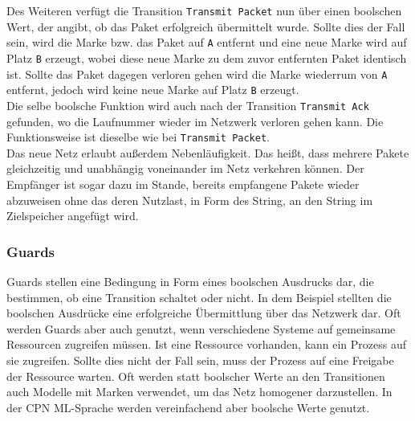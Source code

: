 \documentclass[11pt,onecolumn,a4paper,DIV=calc]{scrartcl}
\begin{document}
Des Weiteren verfügt die Transition \texttt{Transmit Packet} nun über einen boolschen Wert, der angibt, ob das Paket erfolgreich übermittelt wurde. Sollte dies der Fall sein, wird die Marke bzw. das Paket auf \texttt{A} entfernt und eine neue Marke wird auf Platz \texttt{B} erzeugt, wobei diese neue Marke zu dem zuvor entfernten Paket identisch ist. Sollte das Paket dagegen verloren gehen wird die Marke wiederrum von \texttt{A} entfernt, jedoch wird keine neue Marke auf Platz \texttt{B} erzeugt.\\
Die selbe boolsche Funktion wird auch nach der Transition \texttt{Transmit Ack} gefunden, wo die Laufnummer wieder im Netzwerk verloren gehen kann. Die Funktionsweise ist dieselbe wie bei \texttt{Transmit Packet}.\\
Das neue Netz erlaubt außerdem Nebenläufigkeit. Das heißt, dass mehrere Pakete gleichzeitig und unabhängig voneinander im Netz verkehren können. Der Empfänger ist sogar dazu im Stande, bereits empfangene Pakete wieder abzuweisen ohne das deren Nutzlast, in Form des String, an den String im Zielspeicher angefügt wird.


\subsubsection*{Guards}

Guards stellen eine Bedingung in Form eines boolschen Ausdrucks dar, die bestimmen, ob eine Transition schaltet oder nicht. In dem Beispiel stellten die boolschen Ausdrücke eine erfolgreiche Übermittlung über das Netzwerk dar. Oft werden Guards aber auch genutzt, wenn verschiedene Systeme auf gemeinsame Ressourcen zugreifen müssen. Ist eine Ressource vorhanden, kann ein Prozess auf sie zugreifen. Sollte dies nicht der Fall sein, muss der Prozess auf eine Freigabe der Ressource warten. Oft werden statt boolscher Werte an den Transitionen auch Modelle mit Marken verwendet, um das Netz homogener darzustellen. In der CPN ML-Sprache werden vereinfachend aber boolsche Werte genutzt. %
\end{document}
